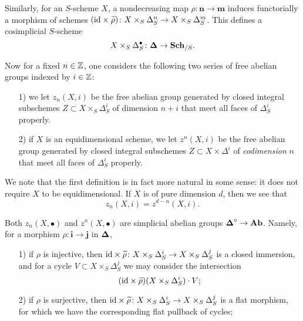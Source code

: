 Similarly, for an $S$-scheme $X$, a nondecreasing map
$\rho\colon \mathbf{n} \to \mathbf{m}$ induces functorially a morphism of
schemes
$(\mathrm{id}\times\widetilde{\rho})\colon X\times_S\Delta^n_S \to X\times_S\Delta^m_S$.
This defines a cosimplicial $S$-scheme
$$X\times_S\Delta^\bullet_S\colon {\boldsymbol\Delta}\to \text{\bf Sch}_{/S}.$$

Now for a fixed $n\in\mathbb{Z}$, one considers the following two series of free
abelian groups indexed by $i\in\mathbb{Z}$:

\begin{enumerate}
\item[1)] we let $z_n (X,i)$ be the free abelian group generated by closed
  integral subschemes $Z \subset X\times_S\Delta^i_S$ of dimension $n+i$ that
  meet all faces of $\Delta^i_S$ properly.

\item[2)] if $X$ is an equidimensional scheme, we let $z^n (X,i)$ be the free
  abelian group generated by closed integral subschemes
  $Z\subset X\times \Delta^i$ of \emph{codimension} $n$ that meet all faces of
  $\Delta^i_S$ properly.
\end{enumerate}

We note that the first definition is in fact more natural in some sense: it does
not require $X$ to be equidimensional. If $X$ is of pure dimension $d$, then we
see that
\begin{equation}
  \label{eqn:comparison-of-zn-for-dim-and-codim}
  z_n (X,i) = z^{d-n} (X,i).
\end{equation}

Both $z_n (X,\bullet)$ and $z^n (X,\bullet)$ are simplicial abelian groups
${\boldsymbol\Delta}^\circ \to \text{\bf Ab}$. Namely, for a morphism $\rho\colon \mathbf{i}
\to \mathbf{j}$ in ${\boldsymbol\Delta}$,

\begin{enumerate}
\item[1)] if $\rho$ is injective, then
  $\mathrm{id}\times \widetilde{\rho}\colon X\times_S\Delta^i_S \to X\times_S\Delta^j_S$
  is a closed immersion, and for a cycle $V \subset X\times_S \Delta_S^j$ we may
  consider the intersection
  $$(\mathrm{id}\times \widetilde{\rho}) (X\times_S\Delta^i_S) \cdot V;$$

\item[2)] if $\rho$ is surjective, then
  $\mathrm{id}\times \widetilde{\rho}\colon X\times_S\Delta^i_S \to X\times_S\Delta^j_S$
  is a flat morphism, for which we have the corresponding flat pullback of
  cycles;
\end{enumerate}

